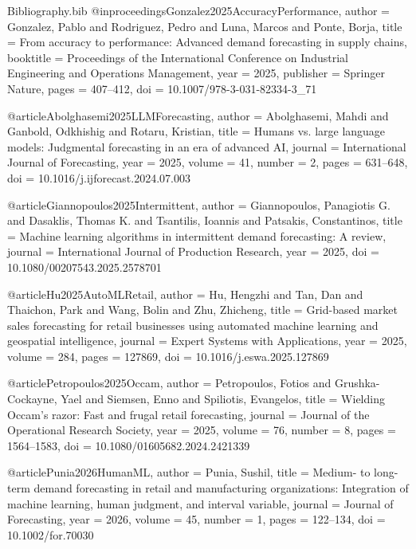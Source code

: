 \begin{filecontents*}{Bibliography.bib}
@inproceedings{Gonzalez2025AccuracyPerformance,
  author    = {Gonzalez, Pablo and Rodriguez, Pedro and Luna, Marcos and Ponte, Borja},
  title     = {From accuracy to performance: Advanced demand forecasting in supply chains},
  booktitle = {Proceedings of the International Conference on Industrial Engineering and Operations Management},
  year      = {2025},
  publisher = {Springer Nature},
  pages     = {407--412},
  doi       = {10.1007/978-3-031-82334-3\_71}
}

@article{Abolghasemi2025LLMForecasting,
  author  = {Abolghasemi, Mahdi and Ganbold, Odkhishig and Rotaru, Kristian},
  title   = {Humans vs. large language models: Judgmental forecasting in an era of advanced AI},
  journal = {International Journal of Forecasting},
  year    = {2025},
  volume  = {41},
  number  = {2},
  pages   = {631--648},
  doi     = {10.1016/j.ijforecast.2024.07.003}
}

@article{Giannopoulos2025Intermittent,
  author  = {Giannopoulos, Panagiotis G. and Dasaklis, Thomas K. and Tsantilis, Ioannis and Patsakis, Constantinos},
  title   = {Machine learning algorithms in intermittent demand forecasting: A review},
  journal = {International Journal of Production Research},
  year    = {2025},
  doi     = {10.1080/00207543.2025.2578701}
}

@article{Hu2025AutoMLRetail,
  author  = {Hu, Hengzhi and Tan, Dan and Thaichon, Park and Wang, Bolin and Zhu, Zhicheng},
  title   = {Grid-based market sales forecasting for retail businesses using automated machine learning and geospatial intelligence},
  journal = {Expert Systems with Applications},
  year    = {2025},
  volume  = {284},
  pages   = {127869},
  doi     = {10.1016/j.eswa.2025.127869}
}

@article{Petropoulos2025Occam,
  author  = {Petropoulos, Fotios and Grushka-Cockayne, Yael and Siemsen, Enno and Spiliotis, Evangelos},
  title   = {Wielding Occam's razor: Fast and frugal retail forecasting},
  journal = {Journal of the Operational Research Society},
  year    = {2025},
  volume  = {76},
  number  = {8},
  pages   = {1564--1583},
  doi     = {10.1080/01605682.2024.2421339}
}

@article{Punia2026HumanML,
  author  = {Punia, Sushil},
  title   = {Medium- to long-term demand forecasting in retail and manufacturing organizations: Integration of machine learning, human judgment, and interval variable},
  journal = {Journal of Forecasting},
  year    = {2026},
  volume  = {45},
  number  = {1},
  pages   = {122--134},
  doi     = {10.1002/for.70030}
}


\end{filecontents*}
